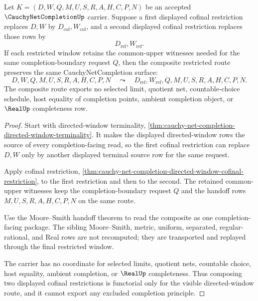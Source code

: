 \begin{theorem}
\label{thm:cauchy-net-completion-directed-window-refinement-functoriality}
Let $K=(D,W,Q,M,U,S,R,A,H,C,P,N)$ be an accepted $\CauchyNetCompletionUp$ carrier. Suppose a first displayed cofinal restriction replaces $D,W$ by $D_{\mathrm{cof}},W_{\mathrm{cof}}$, and a second displayed cofinal restriction replaces those rows by
$$
D_{\mathrm{ref}},W_{\mathrm{ref}} .
$$
If each restricted window retains the common-upper witnesses needed for the same completion-boundary request $Q$, then the composite restricted route preserves the same CauchyNetCompletion surface:
$$
D,W,Q,M,U,S,R,A,H,C,P,N
\quad\leadsto\quad
D_{\mathrm{ref}},W_{\mathrm{ref}},Q,M,U,S,R,A,H,C,P,N .
$$
The composite route exports no selected limit, quotient net, countable-choice schedule, host equality of completion points, ambient completion object, or $\RealUp$ completeness row.
\end{theorem}
\begin{proof}
Start with directed-window terminality, \autoref{thm:cauchy-net-completion-directed-window-terminality}. It makes the displayed directed-window rows the source of every completion-facing read, so the first cofinal restriction can replace $D,W$ only by another displayed terminal source row for the same request.

Apply cofinal restriction, \autoref{thm:cauchy-net-completion-directed-window-cofinal-restriction}, to the first restriction and then to the second. The retained common-upper witnesses keep the completion-boundary request $Q$ and the handoff rows $M,U,S,R,A,H,C,P,N$ on the same route.

Use the Moore--Smith handoff theorem to read the composite as one completion-facing package. The sibling Moore--Smith, metric, uniform, separated, regular-rational, and Real rows are not recomputed; they are transported and replayed through the final restricted window.

The carrier has no coordinate for selected limits, quotient nets, countable choice, host equality, ambient completion, or $\RealUp$ completeness. Thus composing two displayed cofinal restrictions is functorial only for the visible directed-window route, and it cannot export any excluded completion principle.
\end{proof}

